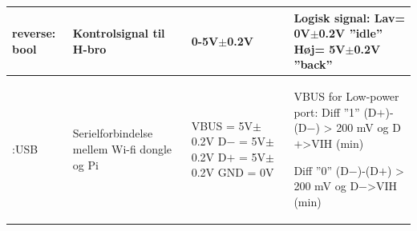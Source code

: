 \begin{table}[h]
\begin{tabularx}{\textwidth}{|l|X|X|X|}
reverse: bool	
	& Kontrolsignal til H-bro
	& 0-5V$\pm$0.2V	
	& Logisk signal: 					\newline
		Lav= 0V$\pm$0.2V ''idle''		\newline
		Høj= 5V$\pm$0.2V ''back''
	\\ \hline
	
:USB 	
	& Serielforbindelse mellem Wi-fi dongle og Pi	
	& VBUS = 5V$\pm$0.2V 				\newline 
	  D$-$ = 5V$\pm$0.2V					\newline
	  D$+$ = 5V$\pm$0.2V					\newline
	  GND = 0V							\newline	  
	  & VBUS for Low-power port: 		\newline
		Diff  ''1''						\newline
		(D$+$)-(D$-$) > 200 mV				\newline
		og D$+$>VIH (min)					\newline

		Diff ''0''						\newline
		(D$-$)-(D$+$) > 200 mV				\newline
		og D$-$>VIH (min)					\newline
	\\ \hline	
	
	\end{tabularx}
\end{table}
